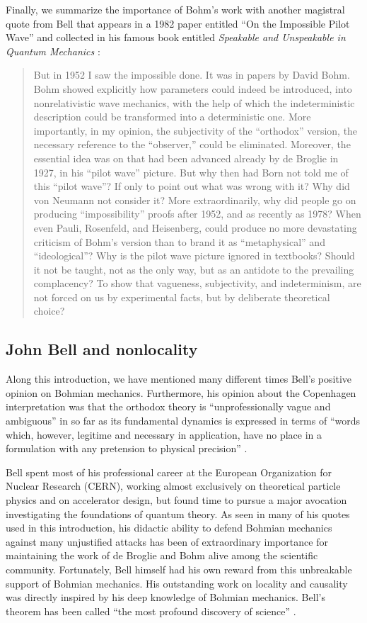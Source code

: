 \documentclass[onecolumn,nofootinbib, secnumarabic, amsmath, nobibnotes,11pt,aps,pra]{revtex4-1}
\begin{document}
Finally, we summarize the importance of Bohm's work with another magistral quote from Bell that appears in a 1982 paper entitled ``On the Impossible Pilot Wave'' and collected in his famous book entitled \textit{Speakable and Unspeakable in Quantum Mechanics} \cite{om.Bell1987}:
\begin{quote}
But in 1952 I saw the impossible done. It was in papers by David Bohm. Bohm showed explicitly how parameters could indeed be introduced, into nonrelativistic wave mechanics, with the help of which the indeterministic description could be transformed into a deterministic one. More importantly, in my opinion, the subjectivity of the ``orthodox'' version, the necessary reference to the ``observer,'' could be eliminated. Moreover, the essential idea was on that had been advanced already by de Broglie in 1927, in his ``pilot wave'' picture. But why then had Born not told me of this ``pilot wave''? If only to point out what was wrong with it? Why did von Neumann not consider it? More extraordinarily, why did people go on producing ``impossibility'' proofs after 1952, and as recently as 1978? When even Pauli, Rosenfeld, and Heisenberg, could produce no more devastating criticism of Bohm's version than to brand it as ``metaphysical'' and ``ideological''? Why is the pilot wave picture ignored in textbooks? Should it not be taught, not as the only way, but as an antidote to the prevailing complacency? To show that vagueness, subjectivity, and indeterminism, are not forced on us by experimental facts, but by deliberate theoretical choice?
\end{quote}

\subsection{John Bell and nonlocality} \label{om.sec_intro.8}

Along this introduction, we have mentioned many different times Bell's positive opinion on Bohmian mechanics. Furthermore, his opinion about the Copenhagen interpretation was that the orthodox theory is ``unprofessionally vague and ambiguous'' \cite{om.Bell1987,om.bell1990,om.bell1982,om.Bell1964} in so far as its fundamental dynamics is expressed in terms of ``words which, however, legitime and necessary in application, have no place in a formulation with any pretension to physical precision'' \cite{om.bell1990}.

Bell spent most of his professional career at the European
Organization for Nuclear Research (CERN), working almost exclusively
on theoretical particle physics and on accelerator design, but found
time to pursue a major avocation investigating the foundations of
quantum theory. As seen in many of his quotes used in this
introduction, his didactic ability to defend Bohmian mechanics
against many unjustified attacks has been of extraordinary
importance for maintaining the work of de Broglie and Bohm alive
among the scientific community. Fortunately, Bell himself had his
own reward from this unbreakable support of Bohmian mechanics. His
outstanding work on locality and causality was directly inspired by
his deep knowledge of Bohmian mechanics. Bell's theorem has been
called ``the most profound discovery of science''
\cite{om.stapp1977}.
\end{document}
